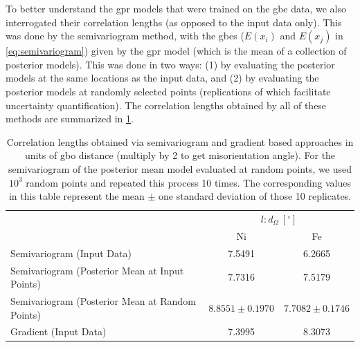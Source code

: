 \documentclass[final,twocolumn,12pt]{elsarticle}
\begin{document}
	To better understand the \gls{gpr} models that were trained on the \gls{gbe} data, we also interrogated their correlation lengths (as opposed to the input data only). This was done by the semivariogram method, with the \glspl{gbe} ($E\left(x_i\right)$ and $E\left(x_j\right)$ in \cref{eq:semivariogram}) given by the \gls{gpr} model (which is the mean of a collection of posterior models). This was done in two ways: (1) by evaluating the posterior models at the same locations as the input data, and (2) by evaluating the posterior models at randomly selected points (replications of which facilitate uncertainty quantification). The correlation lengths obtained by all of these methods are summarized in \cref{tab:globalcorrelationlengths}.
	\begin{table}[]
	    \centering
	    \caption{Correlation lengths obtained via semivariogram and gradient based approaches in units of \gls{gbo} distance (multiply by 2 to get misorientation angle). For the semivariogram of the posterior mean model evaluated at random points, we used $10^3$ random points and repeated this process 10 times. The corresponding values in this table represent the mean $\pm$ one standard deviation of those 10 replicates.}
	    \label{tab:globalcorrelationlengths}
	    \begin{tabular}{l c c}
	    \toprule
	         & \multicolumn{2}{c}{$l: d_\Omega\ [{}^{\circ}]$} \\
	         \cline{2-3}
	         & Ni & Fe \rule{0pt}{2.6ex}\\
	         \midrule
	         Semivariogram (Input Data) & 7.5491 & 6.2665 \\
	         Semivariogram (Posterior Mean at Input Points) & 7.7316 & 7.5179 \\ 
	         Semivariogram (Posterior Mean at Random Points) & $8.8551 \pm 0.1970$ & $7.7082 \pm 0.1746$ \\
	         Gradient (Input Data) & 7.3995 & 8.3073 \\
	         \bottomrule
	    \end{tabular}
	\end{table}
	
\end{document}
